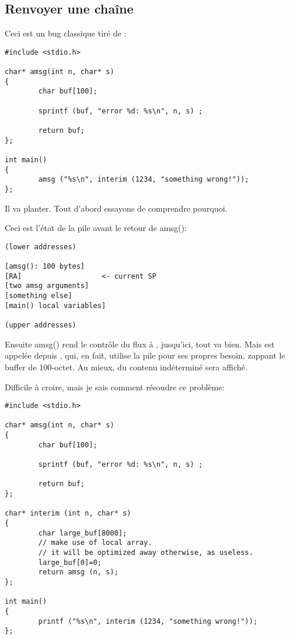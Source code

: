\subsection{Renvoyer une chaîne}

Ceci est un bug classique tiré de \RobPikePractice{}:

\begin{lstlisting}[style=customc]
#include <stdio.h>

char* amsg(int n, char* s)
{
        char buf[100];

        sprintf (buf, "error %d: %s\n", n, s) ;

        return buf;
};

int main()
{
        amsg ("%s\n", interim (1234, "something wrong!"));
};
\end{lstlisting}

Il va planter.
Tout d'abord essayons de comprendre pourquoi.

Ceci est l'état de la pile avant le retour de amsg():

\begin{lstlisting}
(lower addresses)

[amsg(): 100 bytes]
[RA]                   <- current SP
[two amsg arguments]
[something else]
[main() local variables]

(upper addresses)
\end{lstlisting}

Ensuite amsg() rend le contrôle du flux à \main, jusqu'ici, tout va bien.
Mais \printf est appelée depuis \main, qui, en fait, utilise la pile pour ses propres
besoin, zappant le buffer de 100-octet.
Au mieux, du contenu indéterminé sera affiché.

Difficile à croire, mais je sais comment résoudre ce problème:

\begin{lstlisting}[style=customc]
#include <stdio.h>

char* amsg(int n, char* s)
{
        char buf[100];

        sprintf (buf, "error %d: %s\n", n, s) ;

        return buf;
};

char* interim (int n, char* s)
{
        char large_buf[8000];
        // make use of local array.
        // it will be optimized away otherwise, as useless.
        large_buf[0]=0;
        return amsg (n, s);
};

int main()
{
        printf ("%s\n", interim (1234, "something wrong!"));
};
\end{lstlisting}

